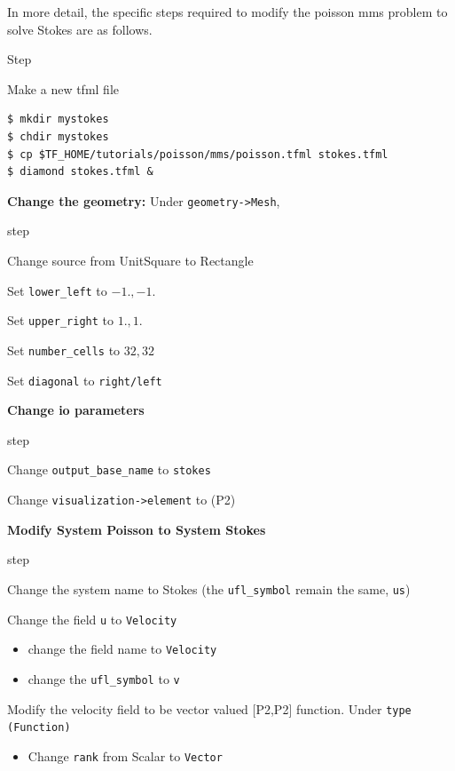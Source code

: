 \pagebreak{}

In more detail, the specific steps required to modify the poisson mms
problem to solve Stokes are as follows.
\begin{steps}{Step}
\item Make a new tfml file
  \begin{lstlisting}[style=Bash]
$ mkdir mystokes
$ chdir mystokes
$ cp $TF_HOME/tutorials/poisson/mms/poisson.tfml stokes.tfml
$ diamond stokes.tfml &
  \end{lstlisting}%
\item \textbf{Change the geometry:} Under \texttt{geometry->Mesh},
  \begin{steps}{step}
  \item Change source from UnitSquare to Rectangle
  \item Set \texttt{lower\_left} to $-1.,-1.$
  \item Set \texttt{upper\_right} to $1.,1.$
  \item Set \texttt{number\_cells} to $32,32$
  \item Set \texttt{diagonal} to \texttt{right/left}
  \end{steps}
\item \textbf{Change io parameters}
  \begin{steps}{step}
  \item Change \texttt{output\_base\_name} to \texttt{stokes}
  \item Change \texttt{visualization->element} to (P2)
  \end{steps}
\item \textbf{Modify System Poisson to System Stokes}
  \begin{steps}{step}
  \item Change the system name to  Stokes (the \texttt{ufl\_symbol}
    remain the same, \texttt{us})
  \item Change the field \texttt{u} to \texttt{Velocity}
    \begin{itemize}{}
    \item change the field name to \texttt{Velocity}
    \item change the \texttt{ufl\_symbol} to \texttt{v}
    \end{itemize}
  \item Modify the velocity field to be vector valued [P2,P2]
    function.   Under \texttt{type (Function)}
    \begin{itemize}{}
    \item Change \texttt{rank} from Scalar to \texttt{Vector}

\end{itemize}
\end{steps}
\end{steps}
